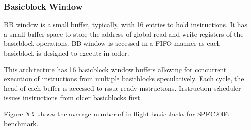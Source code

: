 \subsubsection{Basicblock Window}
\label{sec:bb_window}

BB window is a small buffer, typically, with 16 entries to hold instructions. It
has a small buffer space to store the address of global read and write registers
of the basicblock operations. BB window is accessed in a FIFO manner as each basicblock is
designed to execute in-order.

This architecture has 16 basicblock window buffers allowing for concurrent
execution of instructions from multiple basicblocks speculatively. Each cycle,
the head of each buffer is accessed to issue ready instructions.  Instruction
scheduler issues instructions from older basicblocks first.

Figure XX shows the average number of in-flight basicblocks for SPEC2006
benchmark.
